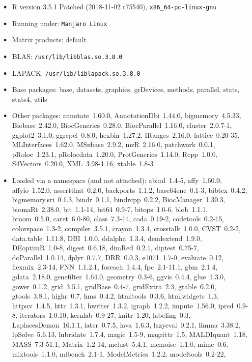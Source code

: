 \documentclass[12pt]{article}\usepackage[]{graphicx}\usepackage[]{color}
\begin{document}
\begin{appendices}
\begin{itemize}\raggedright
  \item R version 3.5.1 Patched (2018-11-02 r75540), \verb|x86_64-pc-linux-gnu|
  \item Running under: \verb|Manjaro Linux|
  \item Matrix products: default
  \item BLAS: \verb|/usr/lib/libblas.so.3.8.0|
  \item LAPACK: \verb|/usr/lib/liblapack.so.3.8.0|
  \item Base packages: base, datasets, graphics, grDevices,
    methods, parallel, stats, stats4, utils
  \item Other packages: annotate~1.60.0, AnnotationDbi~1.44.0,
    bigmemory~4.5.33, Biobase~2.42.0, BiocGenerics~0.28.0,
    BiocParallel~1.16.0, cluster~2.0.7-1, ggplot2~3.1.0,
    ggrepel~0.8.0, hexbin~1.27.2, IRanges~2.16.0, lattice~0.20-35,
    MLInterfaces~1.62.0, MSnbase~2.9.2, mzR~2.16.0,
    patchwork~0.0.1, pRoloc~1.23.1, pRolocdata~1.20.0,
    ProtGenerics~1.14.0, Rcpp~1.0.0, S4Vectors~0.20.0,
    XML~3.98-1.16, xtable~1.8-3
  \item Loaded via a namespace (and not attached): abind~1.4-5,
    affy~1.60.0, affyio~1.52.0, assertthat~0.2.0, backports~1.1.2,
    base64enc~0.1-3, bibtex~0.4.2, bigmemory.sri~0.1.3,
    bindr~0.1.1, bindrcpp~0.2.2, BiocManager~1.30.3,
    biomaRt~2.38.0, bit~1.1-14, bit64~0.9-7, bitops~1.0-6,
    blob~1.1.1, broom~0.5.0, caret~6.0-80, class~7.3-14,
    coda~0.19-2, codetools~0.2-15, colorspace~1.3-2,
    compiler~3.5.1, crayon~1.3.4, crosstalk~1.0.0, CVST~0.2-2,
    data.table~1.11.8, DBI~1.0.0, ddalpha~1.3.4, dendextend~1.9.0,
    DEoptimR~1.0-8, digest~0.6.18, dimRed~0.2.1, diptest~0.75-7,
    doParallel~1.0.14, dplyr~0.7.7, DRR~0.0.3, e1071~1.7-0,
    evaluate~0.12, flexmix~2.3-14, FNN~1.1.2.1, foreach~1.4.4,
    fpc~2.1-11.1, gbm~2.1.4, gdata~2.18.0, genefilter~1.64.0,
    geometry~0.3-6, ggvis~0.4.4, glue~1.3.0, gower~0.1.2,
    grid~3.5.1, gridBase~0.4-7, gridExtra~2.3, gtable~0.2.0,
    gtools~3.8.1, highr~0.7, hms~0.4.2, htmltools~0.3.6,
    htmlwidgets~1.3, httpuv~1.4.5, httr~1.3.1, hwriter~1.3.2,
    igraph~1.2.2, impute~1.56.0, ipred~0.9-8, iterators~1.0.10,
    kernlab~0.9-27, knitr~1.20, labeling~0.3,
    LaplacesDemon~16.1.1, later~0.7.5, lava~1.6.3, lazyeval~0.2.1,
    limma~3.38.2, lpSolve~5.6.13, lubridate~1.7.4, magic~1.5-9,
    magrittr~1.5, MALDIquant~1.18, MASS~7.3-51.1, Matrix~1.2-14,
    mclust~5.4.1, memoise~1.1.0, mime~0.6, mixtools~1.1.0,
    mlbench~2.1-1, ModelMetrics~1.2.2, modeltools~0.2-22,

\end{itemize}
\end{appendices}
\end{document}
